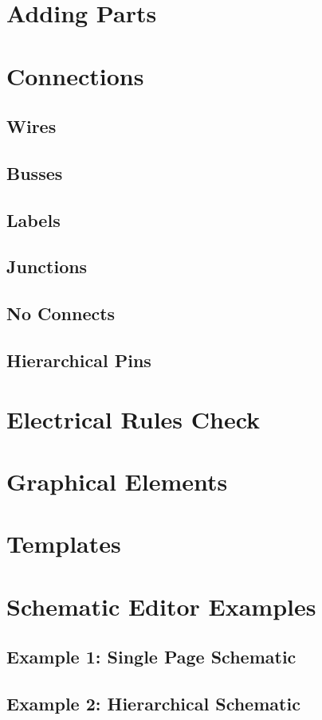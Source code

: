 \section{Adding Parts}

\section{Connections}
\subsection{Wires}
\subsection{Busses}
\subsection{Labels}
\subsection{Junctions}
\subsection{No Connects}
\subsection{Hierarchical Pins}

\section{Electrical Rules Check}

\section{Graphical Elements}

\section{Templates}

\section{Schematic Editor Examples}
\subsection{Example 1: Single Page Schematic}
\subsection{Example 2: Hierarchical Schematic}